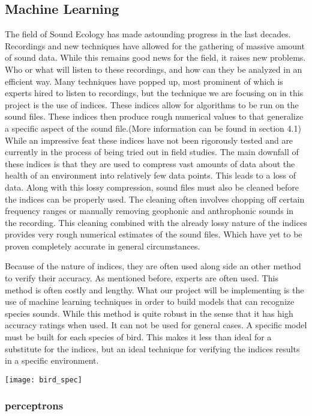 \subsection{Machine Learning}
\par The field of Sound Ecology has made astounding progress in the last decades. Recordings and new techniques have allowed for the gathering of massive amount of sound data. While this remains good news for the field, it raises new problems. Who or what will listen to these recordings, and how can they be analyzed in an efficient way. Many techniques have popped up, most prominent of which is experts hired to listen to recordings, but the technique we are focusing on in this project is the use of indices. These indices allow for algorithms to be run on the sound files. These indices then produce rough numerical values to that generalize a specific aspect of the sound file.(More information can be found in section 4.1) While an impressive feat these indices have not been rigorously tested and are currently in the process of being tried out in field studies. The main downfall of these indices is that they are used to compress vast amounts of data about the health of an environment into relatively few data points. This leads to a loss of data. Along with this lossy compression, sound files must also be cleaned before the indices can be properly used. The cleaning often involves chopping off certain frequency ranges or manually removing geophonic and anthrophonic sounds in the recording. This cleaning combined with the already lossy nature of the indices provides very rough numerical estimates of the sound files. Which have yet to be proven completely accurate in general circumstances.
\par Because of the nature of indices, they are often used along side an other method to verify their accuracy. As mentioned before, experts are often used. This method is often costly and lengthy. What our project will be implementing is the use of machine learning techniques in order to build models that can recognize species sounds. While this method is quite robust in the sense that it has high accuracy ratings when used. It can not be used for general cases. A specific model must be built for each species of bird. This makes it less than ideal for a substitute for the indices, but an ideal technique for verifying the indices results in a specific environment.
\begin{center}
	\texttt{[image: bird\_spec]}
\end{center}

\subsubsection{perceptrons}
\par
